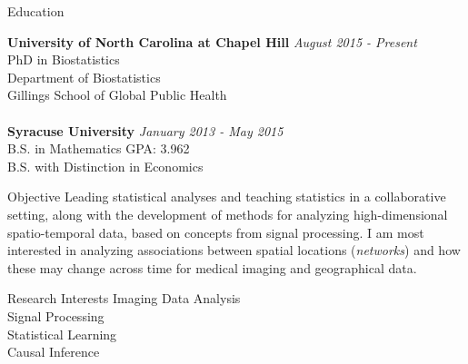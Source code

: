 \documentclass{resume} %
\begin{document}

\begin{rSection}{Education}

{\bf University of North Carolina at Chapel Hill} \hfill {\em August 2015 - Present} 
\\ PhD in Biostatistics
\\ Department of Biostatistics
\\ Gillings School of Global Public Health\\
\\{\bf Syracuse University} \hfill {\em January 2013 - May 2015} 
\\ B.S. in Mathematics\hfill { GPA: 3.962}
\\ B.S. with Distinction in Economics

\end{rSection}


\begin{rSection}{Objective}
Leading statistical analyses and teaching statistics in a collaborative setting, along with the development of methods for analyzing high-dimensional spatio-temporal data, based on concepts from signal processing.  I am most interested in analyzing associations between spatial locations (\textit{networks}) and how these may change across time for medical imaging and geographical data.
\end{rSection}


\begin{rSection}{Research Interests}
Imaging Data Analysis\\
Signal Processing\\
Statistical Learning\\
Causal Inference
\end{rSection}
\end{document}

